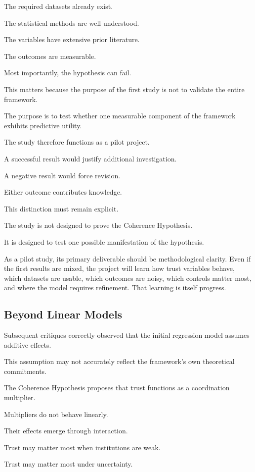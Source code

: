 \documentclass[12pt]{article}
\begin{document}
The required datasets already exist.

The statistical methods are well understood.

The variables have extensive prior literature.

The outcomes are measurable.

Most importantly, the hypothesis can fail.

This matters because the purpose of the first study is not to validate the entire framework.

The purpose is to test whether one measurable component of the framework exhibits predictive utility.

The study therefore functions as a pilot project.

A successful result would justify additional investigation.

A negative result would force revision.

Either outcome contributes knowledge.

This distinction must remain explicit.

The study is not designed to prove the Coherence Hypothesis.

It is designed to test one possible manifestation of the hypothesis.

As a pilot study, its primary deliverable should be methodological clarity. Even if the first results are mixed, the project will learn how trust variables behave, which datasets are usable, which outcomes are noisy, which controls matter most, and where the model requires refinement. That learning is itself progress.

\subsection{Beyond Linear Models}

Subsequent critiques correctly observed that the initial regression model assumes additive effects.

This assumption may not accurately reflect the framework's own theoretical commitments.

The Coherence Hypothesis proposes that trust functions as a coordination multiplier.

Multipliers do not behave linearly.

Their effects emerge through interaction.

Trust may matter most when institutions are weak.

Trust may matter most under uncertainty.
\end{document}
